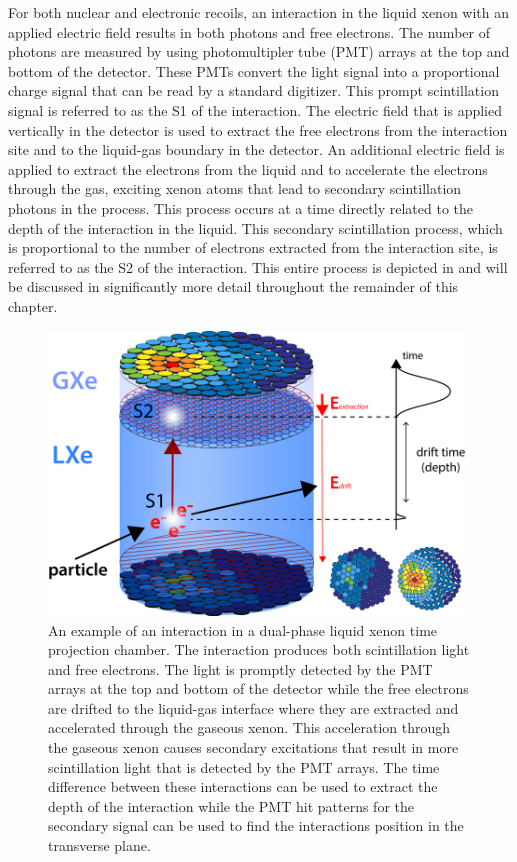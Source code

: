 For both nuclear and electronic recoils, an interaction in the liquid xenon with an applied electric field results in both photons and free electrons.  The number of photons are measured by using photomultipler tube (PMT) arrays at the top and bottom of the detector.  These PMTs convert the light signal into a proportional charge signal that can be read by a standard digitizer.  This prompt scintillation signal is referred to as the S1 of the interaction.  The electric field that is applied vertically in the detector is used to extract the free electrons from the interaction site and to the liquid-gas boundary in the detector.  An additional electric field is applied to extract the electrons from the liquid and to accelerate the electrons through the gas, exciting xenon atoms that lead to secondary scintillation photons in the process.  This process occurs at a time directly related to the depth of the interaction in the liquid.  This secondary scintillation process, which is proportional to the number of electrons extracted from the interaction site, is referred to as the S2 of the interaction.  This entire process is depicted in  and will be discussed in significantly more detail throughout the remainder of this chapter.

\begin{figure}[t]
	\centering
	\includegraphics[width=0.99\textwidth]{tpc_principle}
	\caption{An example of an interaction in a dual-phase liquid xenon time projection chamber.  The interaction produces both scintillation light and free electrons.  The light is promptly detected by the PMT arrays at the top and bottom of the detector while the free electrons are drifted to the liquid-gas interface where they are extracted and accelerated through the gaseous xenon.  This acceleration through the gaseous xenon causes secondary excitations that result in more scintillation light that is detected by the PMT arrays.  The time difference between these interactions can be used to extract the depth of the interaction while the PMT hit patterns for the secondary signal can be used to find the interactions position in the transverse plane.}
	\label{fig:tpc_principle}
\end{figure}


